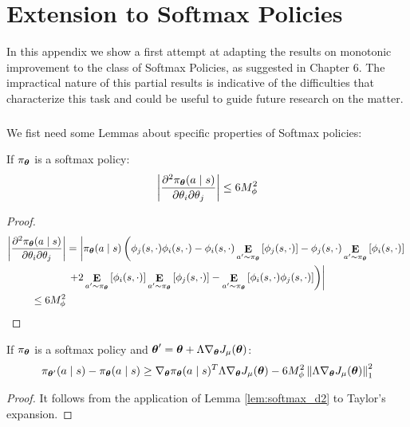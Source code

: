 \chapter{Extension to Softmax Policies}\label{app:softmax}

In this appendix we show a first attempt at adapting the results on monotonic improvement to the class of Softmax Policies, as suggested in Chapter 6. The impractical nature of this partial results is indicative of the difficulties that characterize this task and could be useful to guide future research on the matter.
\paragraph{}
We fist need some Lemmas about specific properties of Softmax policies:

\begin{lemma}\label{lem:softmax_d2}
If $\pi_{\vtheta}$ is a softmax policy:
\[
\left| \frac{\partial^2\pi_{\vtheta}(a \mid s)}
	{\partial\theta_i\partial\theta_j}\right| \leq
	6M_{\phi}^2
\]
\end{lemma}
\begin{proof}
\begin{align*}
\left|\frac{\partial^2\pi_{\vtheta}(a \mid s)}
		{\partial\theta_i\partial\theta_j}\right|
		&= \left| \pi_{\vtheta}(a\mid s)\left(
		\phi_j(s,\cdot)\phi_i(s,\cdot) -  \phi_i(s,\cdot)\expected{a'}{\pi_{\vtheta}}{\phi_j(s,\cdot)} - \phi_j(s,\cdot)\expected{a'}{\pi_{\vtheta}}{\phi_i(s,\cdot)}\right.\right. \\
		&\left.\left.+ 2\expected{a'}{\pi_{\vtheta}}{\phi_i(s,\cdot)}\expected{a'}{\pi_{\vtheta}}{\phi_j(s,\cdot)} - \expected{a'}{\pi_{\vtheta}}{\phi_i(s,\cdot)\phi_j(s,\cdot)}\right)\right| \\
		\leq 6M_\phi^2
\end{align*}
\end{proof}

\begin{lemma}\label{lem:softmax_diff}
If $\pi_{\vtheta}$ is a softmax policy and $\vtheta' = \vtheta+\Lambda\gradJ{\vtheta}$:
\[
\pi_{\vtheta'}(a \mid s) - \pi_{\vtheta}(a \mid s) \geq 
	\nabla_{\vtheta}\pi_{\vtheta}(a \mid s)^T\Lambda\gradJ{\vtheta} -
	6M_{\phi}^2\norm[1]{\Lambda\gradJ{\vtheta}}^2
\]
\end{lemma}
\begin{proof}
It follows from the application of Lemma \ref{lem:softmax_d2} to Taylor's expansion.
\end{proof}

